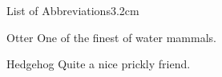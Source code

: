 \begin{mclistof}{List of Abbreviations}{3.2cm}

  \item[Otter] One of the finest of water mammals.

  \item[Hedgehog] Quite a nice prickly friend.

\end{mclistof}
